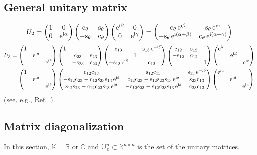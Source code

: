 \documentclass[CheatSheet]{subfiles}
\begin{document}
\subsection{General unitary matrix}
\begin{equation}
 U_2 =
\begin{pmatrix}1&0\\0&\mathop{}\!\mathrm{e}^{\mathrm{i}\alpha}\end{pmatrix}\begin{pmatrix}\mathrm{c}_{\theta}&\mathrm{s}_{\theta}\\-\mathrm{s}_{\theta}&\mathrm{c}_{\theta}\end{pmatrix}\begin{pmatrix}\mathop{}\!\mathrm{e}^{\mathrm{i}\beta}&0\\0&\mathop{}\!\mathrm{e}^{\mathrm{i}\gamma}\end{pmatrix}
=
\begin{pmatrix}\phantom{-}
\mathrm{c}_{\theta}\mathop{}\!\mathrm{e}^{\mathrm{i}\beta} & \mathrm{s}_{\theta}\mathop{}\!\mathrm{e}^{\mathrm{i}\gamma}\\
-\mathrm{s}_{\theta}\mathop{}\!\mathrm{e}^{\mathrm{i}(\alpha+\beta)} & \mathrm{c}_{\theta}\mathop{}\!\mathrm{e}^{\mathrm{i}(\alpha+\gamma)}
\end{pmatrix}
\end{equation}
\begin{align}
 U_3 &=
\pmat{1&&\\&\ee^{\ii a}&\\&&\ee^{\ii b}}
 \pmat{1&&\\&\co{23}&\si{23}\\&-\si{23}&\co{23}}
 \pmat{\co{13}&&\si{13}\ee^{-\ii\delta}\\&1&\\-\si{13}\ee^{\ii\delta}&&\co{13}}
 \pmat{\co{12}&\si{12}&\\-\si{12}&\co{12}&\\&&1}
\pmat{\ee^{\ii c}&&\\&\ee^{\ii d}&\\&&\ee^{\ii e}}
\\&=
\pmat{1&&\\&\ee^{\ii a}&\\&&\ee^{\ii b}}
 \pmat{
 \co{12} \co{13} & \si{12} \co{13} & \si{13} \ee^{-\ii\delta}\\
 -\si{12} \co{23} - \co{12} \si{23} \si{13} \ee^{\ii\delta}& \co{12} \co{23} - \si{12}\si{23}\si{13} \ee^{\ii\delta}& \si{23}\co{13}\\
  \si{12}\si{23} - \co{12} \co{23} \si{13}\ee^{\ii\delta} & -\co{12}\si{23}-\si{12}\co{23}\si{13}\ee^{\ii\delta} & \co{23} \co{13}}
\pmat{\ee^{\ii c}&&\\&\ee^{\ii d}&\\&&\ee^{\ii e}}
\end{align}
(see, e.g., Ref.~\cite{Rasin:1997pn}).

\subsection{Matrix diagonalization}
In this section, $\mathbb K=\mathbb{R}$ or $\mathbb{C}$ and $\mathbb U_{\mathbb K}^{n}\subset \mathbb K^{n\times n}$ is the set of the unitary matrices.
\end{document}
